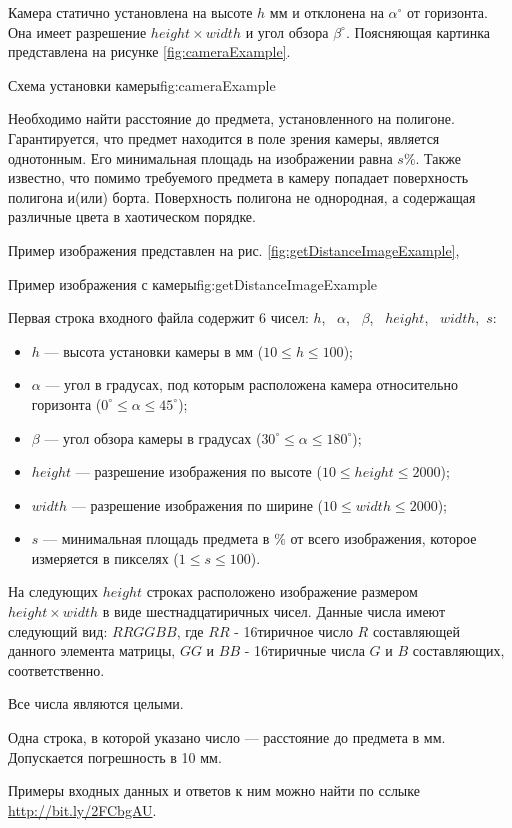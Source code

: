 
Камера статично установлена на высоте $h$ мм и отклонена на $\alpha^\circ$ от горизонта.
Она имеет разрешение $height\times width$ и угол обзора $\beta^\circ$.
Поясняющая картинка представлена на рисунке \ref{fig:cameraExample}.

{Схема установки камеры}{fig:cameraExample}


Необходимо найти расстояние до предмета, установленного на полигоне.
Гарантируется, что предмет находится в поле зрения камеры, является однотонным.
Его минимальная площадь на изображении равна $s \%$.
Также известно, что помимо требуемого предмета
в камеру попадает поверхность полигона и(или) борта.
Поверхность полигона не однородная, а содержащая различные цвета в хаотическом порядке.

Пример изображения представлен на рис.  \ref{fig:getDistanceImageExample},

{Пример изображения с камеры}{fig:getDistanceImageExample}



Первая строка входного файла содержит 6 чисел: $h$,~ $\alpha$,~ $\beta$,~ $height$,~ $width$,~$s$:
\begin{itemize}
    \item $h$ --- высота установки камеры в мм ($10 \leq h \leq 100$);
    \item $\alpha$ --- угол в градусах,  под которым расположена камера относительно горизонта ($0^\circ \leq \alpha \leq 45^\circ$);
    \item $\beta$ --- угол обзора камеры в градусах ($30^\circ \leq \alpha \leq 180^\circ$);
    \item $height$ --- разрешение изображения по высоте ($10 \leq height \leq 2000$);
    \item $width$ --- разрешение изображения по ширине ($10 \leq width \leq 2000$);
    \item $s$ --- минимальная площадь предмета в $\%$ от всего изображения, которое измеряется в пикселях ($1 \leq s \leq 100$).
\end{itemize}

На следующих $height$ строках расположено изображение размером $height\times width$ в виде шестнадцатиричных чисел.
Данные числа имеют следующий вид: $RRGGBB$, где $RR$ - 16тиричное число $R$ составляющей данного элемента
матрицы, $GG$ и $BB$ - 16тиричные числа $G$ и $B$ составляющих, соответственно.

Все числа являются целыми.


\outputfmtSection

Одна строка, в которой указано число --- расстояние до предмета в мм. Допускается погрешность в 10 мм.


\exampleSection

Примеры входных данных и ответов к ним можно найти по сслыке \url{http://bit.ly/2FCbgAU}.


